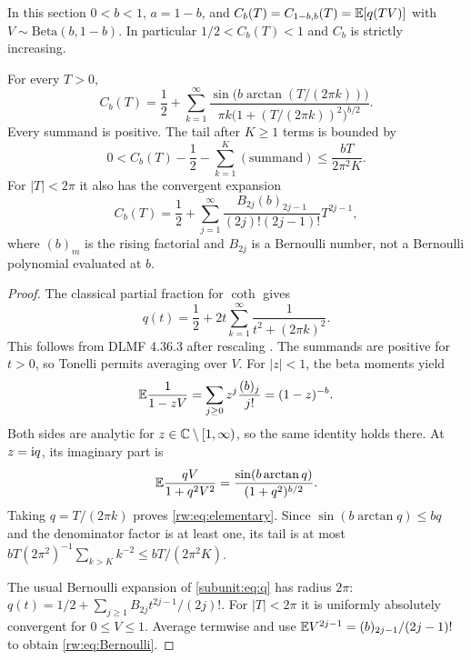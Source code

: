 In this section $0<b<1$, $a=1-b$, and
$C_b(T)=C_{1-b,b}(T)=\mathbb E[q(TV)]$ with
$V\sim\mathrm{Beta}(b,1-b)$. In particular $1/2<C_b(T)<1$ and
$C_b$ is strictly increasing.

\begin{theorem}\label{rw:thm:elementary}
For every $T>0$,
\begin{equation}\label{rw:eq:elementary}
 C_b(T)=\frac12+\sum_{k=1}^\infty
 \frac{\sin\!\bigl(b\arctan(T/(2\pi k))\bigr)}
 {\pi k\bigl(1+(T/(2\pi k))^2\bigr)^{b/2}}.
\end{equation}
Every summand is positive. The tail after $K\ge1$ terms is bounded by
\begin{equation}\label{rw:eq:elementarytail}
 0<C_b(T)-\frac12-\sum_{k=1}^K(\text{summand})
 \le\frac{bT}{2\pi^2K}.
\end{equation}
For $|T|<2\pi$ it also has the convergent expansion
\begin{equation}\label{rw:eq:Bernoulli}
 C_b(T)=\frac12+\sum_{j=1}^\infty
 \frac{B_{2j}(b)_{2j-1}}{(2j)!(2j-1)!}T^{2j-1},
\end{equation}
where $(b)_m$ is the rising factorial and $B_{2j}$ is a Bernoulli
number, not a Bernoulli polynomial evaluated at $b$.
\end{theorem}
\begin{proof}
The classical partial fraction for $\coth$ gives
\begin{equation}\label{rw:eq:hpartial}
 q(t)=\frac12+2t\sum_{k=1}^\infty\frac1{t^2+(2\pi k)^2}.
\end{equation}
This follows from DLMF 4.36.3 after rescaling
\cite{rw:DLMFHyperbolic}. The summands are positive for $t>0$, so
Tonelli permits averaging over $V$.
For $|z|<1$, the beta moments yield
\[
 \mathbb E\frac1{1-zV}=\sum_{j\ge0}z^j\frac{(b)_j}{j!}=(1-z)^{-b}.
\]
Both sides are analytic for $z\in\mathbb C\setminus[1,\infty)$, so the same identity holds
there. At $z=\mathrm{i} q$, its imaginary part is
\[
 \mathbb E\frac{qV}{1+q^2V^2}
 =\frac{\sin(b\arctan q)}{(1+q^2)^{b/2}}.
\]
Taking $q=T/(2\pi k)$ proves \eqref{rw:eq:elementary}.
Since $\sin(b\arctan q)\le bq$ and the denominator factor is at
least one, its tail is at most
$bT(2\pi^2)^{-1}\sum_{k>K}k^{-2}\le bT/(2\pi^2K)$.

The usual Bernoulli expansion of \eqref{subunit:eq:q} has radius $2\pi$:
$q(t)=1/2+\sum_{j\ge1}B_{2j}t^{2j-1}/(2j)!$.
For $|T|<2\pi$ it is uniformly absolutely convergent for
$0\le V\le1$. Average termwise and use
$\mathbb E V^{2j-1}=(b)_{2j-1}/(2j-1)!$ to obtain
\eqref{rw:eq:Bernoulli}.
\end{proof}

